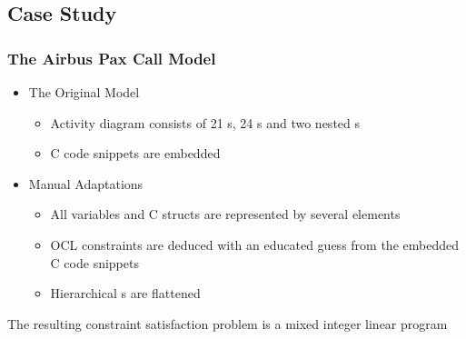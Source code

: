 \documentclass{beamer}
\begin{document}
\subsection{Case Study}
\begin{frame}
\frametitle{The Airbus Pax Call Model}
\begin{itemize}
  \item The Original Model
\begin{itemize}
  \item Activity diagram consists of 21 s, 24 s and two nested s
  \item C code snippets are embedded
\end{itemize}
  \item Manual Adaptations
  \begin{itemize}
  \item All variables and C structs are represented by several  elements
  \item OCL constraints are deduced with an educated guess from the embedded C code snippets
  \item Hierarchical s are flattened
\end{itemize}
\end{itemize}
\begin{block}{}
The resulting constraint satisfaction problem is a mixed integer linear program
\end{block}
\end{frame}
\end{document}
